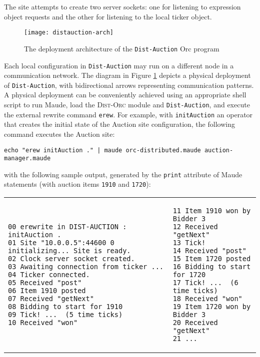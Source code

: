 \documentclass{eptcs}
\begin{document}
\noindent The site attempts to create two server sockets: one for listening to expression object requests and the other for listening to the local ticker object. 


\begin{figure} 	
	\centering
	\texttt{[image: distauction-arch]}
	\caption{The deployment architecture of the \texttt{Dist-Auction} Orc program}
    \label{fig:Dist-Auction-arch}
\end{figure}

Each local configuration in \texttt{Dist-Auction} may run on a different node in a communication network. The diagram in Figure \ref{fig:Dist-Auction-arch} depicts a physical deployment of \texttt{Dist-Auction}, with bidirectional arrows representing communication patterns. A physical deployment can be conveniently achieved using an appropriate shell script to run Maude, load the \textsc{Dist-Orc} module and \texttt{Dist-Auction}, and execute the external rewrite command \texttt{erew}. For example, with \texttt{initAuction} an operator that creates the initial state of the Auction site configuration, the following command executes the Auction site:

\begin{small}
\begin{verbatim}
echo "erew initAuction ." | maude orc-distributed.maude auction-manager.maude 
\end{verbatim}
\end{small}

\noindent with the following sample output, generated by the \texttt{print} attribute of Maude statements (with auction items \texttt{1910} and \texttt{1720}): 
 


\begin{tabular}{@{}p{} p{}@{}}
\begin{scriptsize}
\begin{verbatim}
00 erewrite in DIST-AUCTION : initAuction .
01 Site "10.0.0.5":44600 0 initializing... Site is ready.
02 Clock server socket created. 
03 Awaiting connection from ticker ...
04 Ticker connected.
05 Received "post"
06 Item 1910 posted
07 Received "getNext"
08 Bidding to start for 1910
09 Tick! ...  (5 time ticks)
10 Received "won"
\end{verbatim}
\end{scriptsize}  
&
\begin{scriptsize}
\begin{verbatim}
11 Item 1910 won by Bidder 3
12 Received "getNext"
13 Tick!
14 Received "post"
15 Item 1720 posted
16 Bidding to start for 1720
17 Tick! ...  (6 time ticks)
18 Received "won"
19 Item 1720 won by Bidder 3
20 Received "getNext"
21 ...
\end{verbatim}
\end{scriptsize}
\end{tabular}
\end{document}
